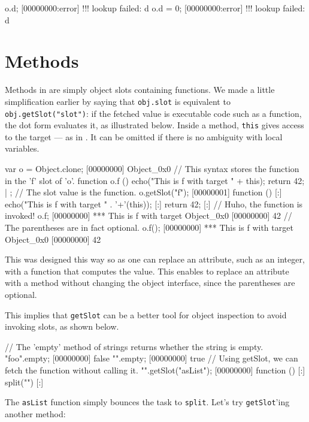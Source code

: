 \begin{urbiscript}[firstnumber=last]
o.d;
[00000000:error] !!! lookup failed: d
o.d = 0;
[00000000:error] !!! lookup failed: d
\end{urbiscript}

\section{Methods}

Methods in \us are simply object slots containing functions. We made a
little simplification earlier by saying that \lstinline|obj.slot| is
equivalent to \lstinline|obj.getSlot("slot")|: if the fetched value is
executable code such as a function, the dot form evaluates it, as
illustrated below. Inside a method, \lstinline|this| gives access to
the target --- as in \Cxx.  It can be omitted if there is no ambiguity
with local variables.

\begin{urbiscript}
var o = Object.clone;
[00000000] Object_0x0
// This syntax stores the function in the 'f' slot of 'o'.
function o.f ()
{
  echo("This is f with target " + this);
  return 42;
} | {};
// The slot value is the function.
o.getSlot("f");
[00000001] function () {
[:]  echo("This is f with target " . '+'(this));
[:]  return 42;
[:]}
// Huho, the function is invoked!
o.f;
[00000000] *** This is f with target Object_0x0
[00000000] 42
// The parentheses are in fact optional.
o.f();
[00000000] *** This is f with target Object_0x0
[00000000] 42
\end{urbiscript}

This was designed this way so as one can replace an attribute, such as
an integer, with a function that computes the value. This enables to
replace an attribute with a method without changing the object
interface, since the parentheses are optional.

This implies that \lstinline|getSlot| can be a better tool for object
inspection to avoid invoking slots, as shown below.

\begin{urbiscript}[firstnumber=last]
// The 'empty' method of strings returns whether the string is empty.
"foo".empty;
[00000000] false
"".empty;
[00000000] true
// Using getSlot, we can fetch the function without calling it.
"".getSlot("asList");
[00000000] function () {
[:]  split("")
[:]}
\end{urbiscript}

The \lstinline|asList| function simply bounces the task to
\lstinline|split|.  Let's try \lstinline{getSlot}'ing another method:

